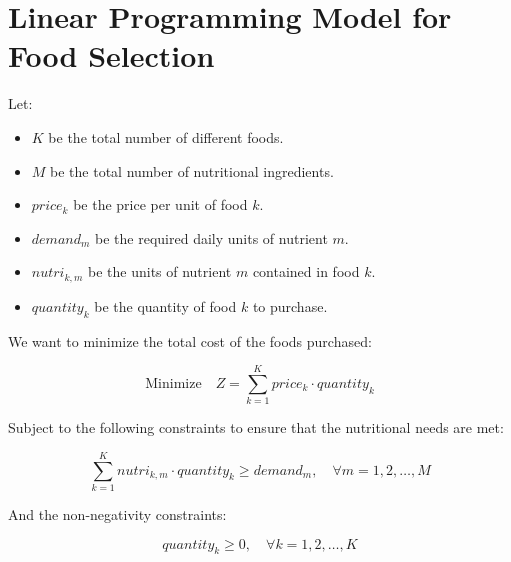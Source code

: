 \documentclass{article}
\begin{document}
\section*{Linear Programming Model for Food Selection}

Let:
\begin{itemize}
    \item $K$ be the total number of different foods.
    \item $M$ be the total number of nutritional ingredients.
    \item $price_k$ be the price per unit of food $k$.
    \item $demand_m$ be the required daily units of nutrient $m$.
    \item $nutri_{k,m}$ be the units of nutrient $m$ contained in food $k$.
    \item $quantity_k$ be the quantity of food $k$ to purchase.
\end{itemize}

We want to minimize the total cost of the foods purchased:

\[
\text{Minimize} \quad Z = \sum_{k=1}^{K} price_k \cdot quantity_k
\]

Subject to the following constraints to ensure that the nutritional needs are met:

\[
\sum_{k=1}^{K} nutri_{k,m} \cdot quantity_k \geq demand_m, \quad \forall m = 1, 2, \ldots, M
\]

And the non-negativity constraints:

\[
quantity_k \geq 0, \quad \forall k = 1, 2, \ldots, K
\]
\end{document}
